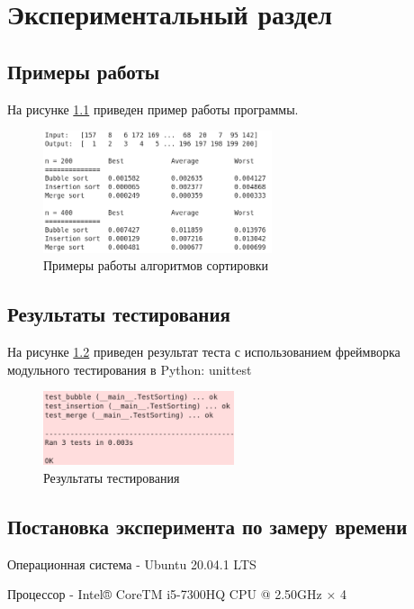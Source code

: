 \chapter{Экспериментальный раздел}
\label{cha:research}

\section{Примеры работы}
На рисунке \ref{fig:4.1} приведен пример работы программы.

\begin{figure}[h]
    \centering
    \includegraphics[width=0.6\textwidth]{3/inc/e1.png}
    \caption{Примеры работы алгоритмов сортировки}
    \label{fig:4.1}
\end{figure}


\section{Результаты тестирования}

На рисунке \ref{fig:4.2} приведен результат теста с использованием
фреймворка модульного тестирования в Python: unittest

\begin{figure}[h]
    \centering
    \includegraphics[width=0.5\textwidth]{3/inc/test.png}
    \caption{Результаты тестирования}
    \label{fig:4.2}
\end{figure}


\section{Постановка эксперимента по замеру времени}

Операционная система - Ubuntu 20.04.1 LTS

Процессор - Intel® CoreTM i5-7300HQ CPU @ 2.50GHz × 4


